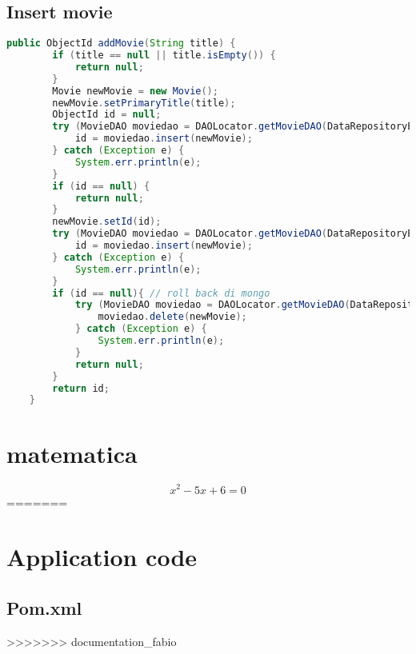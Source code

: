 \begin{alphasection}
\subsection{Insert movie}
\begin{lstlisting}[language=Java]
public ObjectId addMovie(String title) {
        if (title == null || title.isEmpty()) {
            return null;
        }
        Movie newMovie = new Movie();
        newMovie.setPrimaryTitle(title);
        ObjectId id = null;
        try (MovieDAO moviedao = DAOLocator.getMovieDAO(DataRepositoryEnum.MONGO)) {
            id = moviedao.insert(newMovie);
        } catch (Exception e) {
            System.err.println(e);
        }
        if (id == null) {
            return null;
        }
        newMovie.setId(id);
        try (MovieDAO moviedao = DAOLocator.getMovieDAO(DataRepositoryEnum.NEO4j)) {
            id = moviedao.insert(newMovie);
        } catch (Exception e) {
            System.err.println(e);
        }
        if (id == null){ // roll back di mongo
            try (MovieDAO moviedao = DAOLocator.getMovieDAO(DataRepositoryEnum.MONGO)) {
                moviedao.delete(newMovie);
            } catch (Exception e) {
                System.err.println(e);
            }
            return null;
        }
        return id;
    }
\end{lstlisting}
\section{matematica}\label{eq:pippo}
\begin{equation}\label{pippo}
x^2-5x+6=0
\end{equation}
=======

\section{Application code}
\subsection{Pom.xml}\label{subsec:pom}

>>>>>>> documentation_fabio
\end{alphasection}


